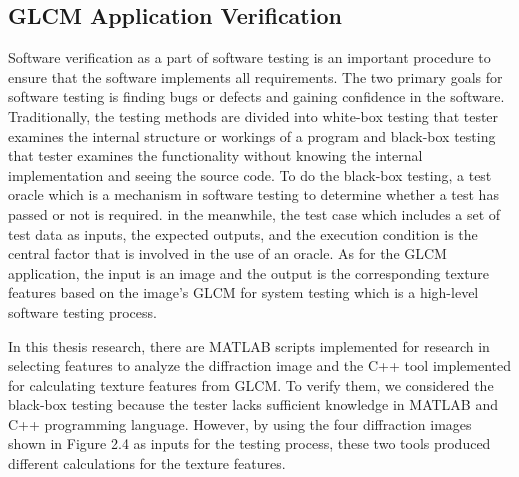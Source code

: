 \subsection{GLCM Application Verification}
Software verification as a part of software testing is an important procedure to ensure that the software implements all requirements. The two primary goals for software testing is finding bugs or defects and gaining confidence in the software\cite{Jiantao}. Traditionally, the testing methods are divided into white-box testing that tester examines the internal structure or workings of a program and black-box testing that tester examines the functionality without knowing the internal implementation and seeing the source code. To do the black-box testing, a test oracle which is a mechanism in software testing to determine whether a test has passed or not\cite{Kaner} is required. in the meanwhile, the test case which includes a set of test data as inputs, the expected outputs, and the execution condition is the central factor that is involved in the use of an oracle. As for the GLCM application, the input is an image and the output is the corresponding texture features based on the image's GLCM for system testing which is a high-level software testing process.\par
In this thesis research, there are MATLAB scripts implemented for research in selecting features to analyze the diffraction image\cite{Thati} and the C++ tool implemented for calculating texture features from GLCM. To verify them, we considered the black-box testing because the tester lacks sufficient knowledge in MATLAB and C++ programming language. However, by using the four diffraction images shown in Figure 2.4 as inputs for the testing process, these two tools produced different calculations for the texture features. 
